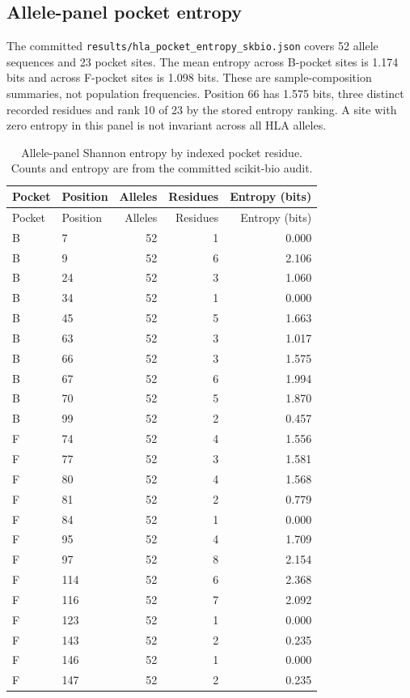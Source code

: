 \subsection{Allele-panel pocket entropy}
The committed \texttt{results/hla\_pocket\_entropy\_skbio.json} covers 52 allele sequences and 23 pocket sites. The mean entropy across B-pocket sites is 1.174 bits and across F-pocket sites is 1.098 bits. These are sample-composition summaries, not population frequencies. Position 66 has 1.575 bits, three distinct recorded residues and rank 10 of 23 by the stored entropy ranking. A site with zero entropy in this panel is not invariant across all HLA alleles.
\begin{longtable}{llrrr}
\caption{Allele-panel Shannon entropy by indexed pocket residue. Counts and entropy are from the committed scikit-bio audit.}\\
\hline Pocket & Position & Alleles & Residues & Entropy (bits)\\\hline\endfirsthead
\hline Pocket & Position & Alleles & Residues & Entropy (bits)\\\hline\endhead
B & 7 & 52 & 1 & 0.000\\
B & 9 & 52 & 6 & 2.106\\
B & 24 & 52 & 3 & 1.060\\
B & 34 & 52 & 1 & 0.000\\
B & 45 & 52 & 5 & 1.663\\
B & 63 & 52 & 3 & 1.017\\
B & 66 & 52 & 3 & 1.575\\
B & 67 & 52 & 6 & 1.994\\
B & 70 & 52 & 5 & 1.870\\
B & 99 & 52 & 2 & 0.457\\
F & 74 & 52 & 4 & 1.556\\
F & 77 & 52 & 3 & 1.581\\
F & 80 & 52 & 4 & 1.568\\
F & 81 & 52 & 2 & 0.779\\
F & 84 & 52 & 1 & 0.000\\
F & 95 & 52 & 4 & 1.709\\
F & 97 & 52 & 8 & 2.154\\
F & 114 & 52 & 6 & 2.368\\
F & 116 & 52 & 7 & 2.092\\
F & 123 & 52 & 1 & 0.000\\
F & 143 & 52 & 2 & 0.235\\
F & 146 & 52 & 1 & 0.000\\
F & 147 & 52 & 2 & 0.235\\
\hline\end{longtable}

